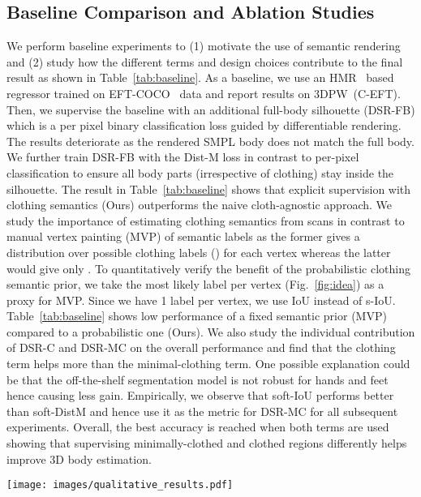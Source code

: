 \documentclass[10pt,twocolumn,letterpaper]{article}
\newcommand{\modelname}[0]{DSR\xspace}
\begin{document}
\subsection{Baseline Comparison and Ablation Studies}\label{sec:baseline}
We perform baseline experiments to (1) motivate the use of semantic rendering and (2) study how the different terms and design choices contribute to the final result as shown in Table~\ref{tab:baseline}.
As a baseline, we use an HMR~\cite{hmr} based regressor trained on EFT-COCO~\cite{eft} data and report results on 3DPW~(C-EFT). Then, we supervise the baseline with an additional full-body silhouette (DSR-FB) which is a per pixel binary classification loss guided by differentiable rendering. The results deteriorate as the rendered SMPL body does not match the full body. We further train DSR-FB with the Dist-M loss in contrast to per-pixel classification to ensure all body parts (irrespective of clothing) stay inside the silhouette. The result in Table~\ref{tab:baseline} shows that explicit supervision with clothing semantics (Ours) outperforms the naive cloth-agnostic approach. We study the importance of estimating clothing semantics from scans in contrast to manual vertex painting (MVP) of semantic labels as the former gives a distribution over possible clothing labels () for each vertex whereas the latter would give only . To quantitatively verify the benefit of the probabilistic clothing semantic prior, we take the most likely label per vertex (Fig.~\ref{fig:idea}) as a proxy for MVP. Since we have 1 label per vertex, we use IoU instead of s-IoU. Table~\ref{tab:baseline} shows low performance of a fixed semantic prior (MVP) compared to a probabilistic one (Ours). We also study the individual contribution of \modelname-C and \modelname-MC on the overall performance and find that the clothing term helps more than the minimal-clothing term. One possible explanation could be that the off-the-shelf segmentation model is not robust for hands and feet hence causing less gain. Empirically, we observe that soft-IoU performs better than soft-DistM and hence use it as the metric for \modelname-MC for all subsequent experiments. Overall, the best accuracy is reached when both terms are used showing that supervising minimally-clothed and clothed regions differently helps improve 3D body estimation.



\begin{figure*}[t]
    \centerline{\texttt{[image: images/qualitative\_results.pdf]}}
    \vspace{-0.15in}
    \caption{\textbf{Qualitative Results on COCO.} From left to right - Input image, SPIN~\cite{spin}, EFT~\cite{eft} and {\modelname}  results.}
    \label{fig:qual_result}
\end{figure*}
\end{document}
